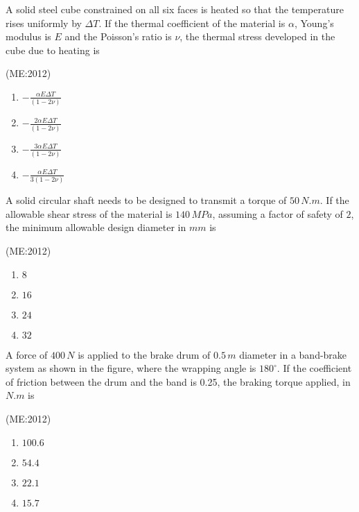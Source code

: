     \item A solid steel cube constrained on all six faces is heated so that the temperature rises uniformly by $\Delta T$. If the thermal coefficient of the material is $\alpha$, Young's modulus is $E$ and the Poisson's ratio is $\nu$, the thermal stress developed in the cube due to heating is

	     \hfill{(ME:2012)}
		\begin{multicols}{4}
    \begin{enumerate}
	    \item $-\frac{\alpha E \Delta T}{(1 - 2\nu)}$
	    \item $-\frac{2 \alpha E \Delta T}{(1 - 2\nu)}$
	    \item $-\frac{3 \alpha E \Delta T}{(1 - 2\nu)}$
        \item $-\frac{\alpha E \Delta T}{3(1 - 2\nu)}$
    \end{enumerate}
		\end{multicols}

    \item 
	    A solid circular shaft needs to be designed to transmit a torque of $50 \, N.m$. If the allowable shear stress of the material is $140 \, MPa$, assuming a factor of safety of $2$, the minimum allowable design diameter in $mm$ is

		 \hfill{(ME:2012)}
		\begin{multicols}{4}
    \begin{enumerate}
        \item $8$
        \item $16$
        \item $24$
        \item $32$
    \end{enumerate}
		\end{multicols}

    \item 
	    A force of $400 \, N$ is applied to the brake drum of $0.5 \, m$ diameter in a band-brake system as shown in the figure, where the wrapping angle is $180^\circ$. If the coefficient of friction between the drum and the band is 0.25, the braking torque applied, in $N.m$ is
		\vspace{1cm}
		\begin{center}
			
		\end{center}

		 \hfill{(ME:2012)}
\begin{multicols}{4}
    \begin{enumerate}
        \item $100.6$
        \item $54.4$
        \item $22.1$
        \item $15.7$
    \end{enumerate}
\end{multicols}

